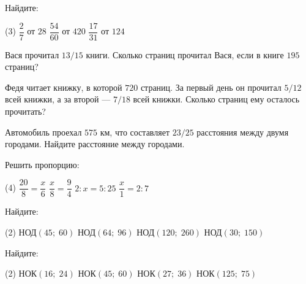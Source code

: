 \begin{class}[number=2]
	\begin{listofex}
	\item Найдите:
	\begin{tasks}(3)
		\task \( \dfrac{2}{7} \) от \( 28 \)
		\task \( \dfrac{54}{60} \) от \( 420 \)
		\task \( \dfrac{17}{31} \) от \( 124 \)
	\end{tasks}
	\item Вася прочитал \( 13/15 \) книги. Сколько страниц прочитал Вася, если в книге \( 195 \) страниц?
	\item Федя читает книжку, в которой \( 720 \) страниц. За первый день он прочитал \( 5/12 \) всей книжки, а за второй --- \( 7/18 \) всей книжки. Сколько страниц ему осталось прочитать?
	\item Автомобиль проехал \( 575 \) км, что составляет \( 23/25 \) расстояния между двумя городами. Найдите расстояние между городами.
	\item Решить пропорцию:
	\begin{tasks}(4)
		\task \( \dfrac{20}{8}=\dfrac{x}{6} \)
		\task \( \dfrac{x}{8}=\dfrac{9}{4} \)
		\task \( 2:x=5:25 \)
		\task \( \dfrac{x}{1}=2:7 \)
	\end{tasks}
	\item Найдите:
	\begin{tasks}(2)
		\task НОД\( (45;\;60) \)
		\task НОД\( (64;\;96) \)
		\task НОД\( (120;\;260) \)
		\task НОД\( (30;\;150) \)
	\end{tasks}
	\item Найдите:
	\begin{tasks}(2)
		\task НОК\( (16;\;24) \)
		\task НОК\( (45;\;60) \)
		\task НОК\( (27;\;36) \)
		\task НОК\( (125;\;75) \)
	\end{tasks}
	\end{listofex}
\end{class}


